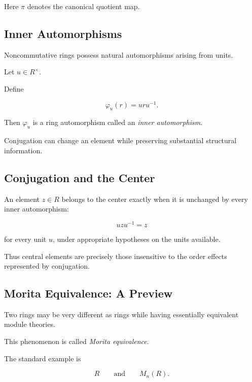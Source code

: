 Here \(\pi\) denotes the canonical quotient map.

\subsection{Inner Automorphisms}
\label{subsec:inner-automorphisms-rings}

Noncommutative rings possess natural automorphisms arising from units.

Let \(u\in R^\times\).

Define

\[ \varphi_u(r)=uru^{-1}. \]

Then \(\varphi_u\) is a ring automorphism called an \emph{inner
automorphism}.

Conjugation can change an element while preserving substantial structural
information.

\subsection{Conjugation and the Center}
\label{subsec:conjugation-center}

An element \(z\in R\) belongs to the center exactly when it is unchanged by
every inner automorphism:

\[ uzu^{-1}=z \]

for every unit \(u\), under appropriate hypotheses on the units available.

Thus central elements are precisely those insensitive to the order effects
represented by conjugation.

\subsection{Morita Equivalence: A Preview}
\label{subsec:morita-equivalence-preview}

Two rings may be very different as rings while having essentially equivalent
module theories.

This phenomenon is called \emph{Morita equivalence}.

The standard example is

\[ R\qquad\text{and}\qquad M_n(R). \]

